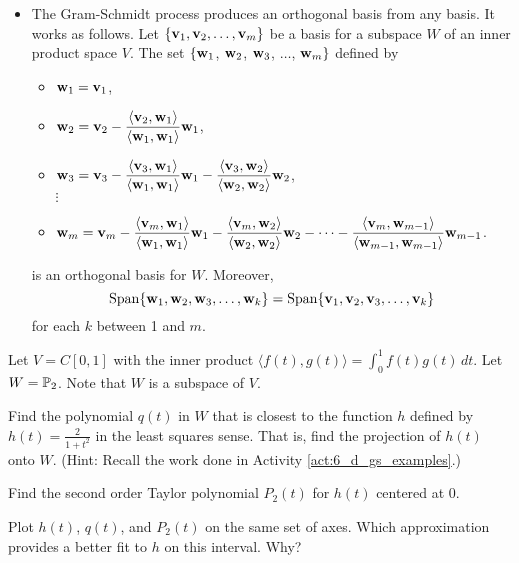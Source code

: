 \begin{itemize}
\item The Gram-Schmidt process produces an orthogonal basis from any basis. It works as follows. Let $\{\mathbf{v}_1, \mathbf{v}_2, \ldots, \mathbf{v}_m\}$ be a basis for a subspace $W$ of an inner product space $V$. The set $\{\mathbf{w}_1$, $\mathbf{w}_2$, $\mathbf{w}_3$, $\ldots$, $\mathbf{w}_{m}\}$ defined by
\begin{itemize}
\item $\mathbf{w}_1 = \mathbf{v}_1$,
\item $\mathbf{w}_2 = \mathbf{v}_2 - \displaystyle \frac{\langle \mathbf{v}_2, \mathbf{w}_1 \rangle}{\langle \mathbf{w}_1, \mathbf{w}_1 \rangle} \mathbf{w}_1$,
\item $\mathbf{w}_3 =  \mathbf{v}_3 - \displaystyle \frac{\langle \mathbf{v}_3, \mathbf{w}_1 \rangle}{\langle \mathbf{w}_1, \mathbf{w}_1 \rangle} \mathbf{w}_1 - \frac{\langle \mathbf{v}_3, \mathbf{w}_2 \rangle}{\langle \mathbf{w}_2, \mathbf{w}_2 \rangle} \mathbf{w}_2$, \\
\qquad $\vdots$
\item $\mathbf{w}_m = \mathbf{v}_m - \displaystyle \frac{\langle \mathbf{v}_m, \mathbf{w}_1 \rangle}{\langle \mathbf{w}_1, \mathbf{w}_1 \rangle} \mathbf{w}_1 - \frac{\langle \mathbf{v}_m, \mathbf{w}_2 \rangle}{\langle \mathbf{w}_2, \mathbf{w}_2 \rangle} \mathbf{w}_2 - \cdots - \frac{\langle \mathbf{v}_m, \mathbf{w}_{m-1} \rangle}{\langle \mathbf{w}_{m-1}, \mathbf{w}_{m-1} \rangle} \mathbf{w}_{m-1}$.
\end{itemize}
is an orthogonal basis for $W$. Moreover,
\[\text{Span}\{\mathbf{w}_1, \mathbf{w}_2, \mathbf{w}_3, \ldots, \mathbf{w}_{k}\} = \text{Span}\{\mathbf{v}_1,\mathbf{v}_2,\mathbf{v}_3, \ldots, \mathbf{v}_{k}\}\]
for each $k$ between 1 and $m$.
\end{itemize}



\be

\item Let $V = C[0,1]$ with the inner product $\langle f(t), g(t) \rangle = \int_0^1 f(t) g(t) \, dt$. Let $W = \mathbb{P}_2$. Note that $W$ is a subspace of $V$. 
	\ba
	\item Find the polynomial $q(t)$ in $W$ that is closest to the function $h$ defined by $h(t) = \frac{2}{1+t^2}$ in the least squares sense. That is, find the projection of $h(t)$ onto $W$. (Hint: Recall the work done in Activity \ref{act:6_d_gs_examples}.) 
	
	\item Find the second order Taylor polynomial $P_2(t)$ for $h(t)$ centered at 0. 

	\item Plot $h(t)$, $q(t)$, and $P_2(t)$ on the same set of axes. Which approximation provides a better fit to $h$ on this interval. Why?
	
	\ea
	
